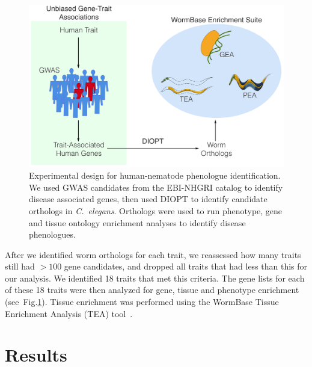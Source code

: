 \documentclass[10pt,letterpaper,twocolumn]{article}
\newcommand{\cel}{\emph{C.~elegans}}
\begin{document}
\begin{figure}[htbp]
  \renewcommand{\familydefault}{\sfdefault}\normalfont{}
  \centering
  \includegraphics[width=\linewidth]{gwas-design.pdf}
  \caption{Experimental design for human-nematode phenologue identification.
           We used GWAS candidates from the EBI-NHGRI catalog to identify
           disease associated genes, then used DIOPT to identify candidate
           orthologs in \cel{}. Orthologs were used to run phenotype, gene
           and tissue ontology enrichment analyses to identify disease
           phenologues.}
\label{fig:gwas}
\end{figure}


After we identified worm orthologs for each trait, we reassessed how many traits
still had $>100$ gene candidates, and dropped all traits that had less than this
for our analysis. We identified 18 traits that met this criteria. The gene
lists for each of these 18 traits were then analyzed for gene, tissue and
phenotype enrichment (see~Fig.\ref{fig:gwas}). Tissue enrichment was
performed using the WormBase Tissue Enrichment Analysis (TEA)
tool~\cite{Angeles-Albores2016}.


\section*{Results}
\end{document}
